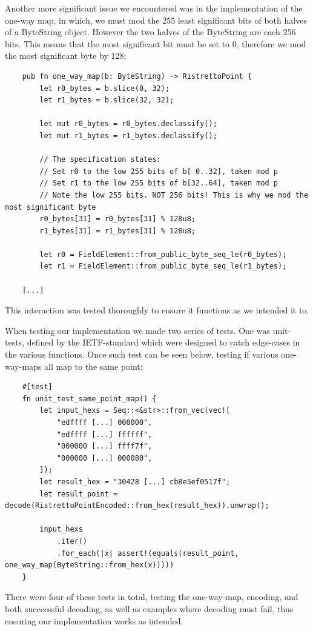\documentclass{article}
\begin{document}
Another more significant issue we encountered was in the implementation
of the one-way map, in which, we must mod the 255 least significant
bits of both halves of a ByteString object. However the two halves of
the ByteString are each 256 bits. This means that the most significant
bit must be set to 0, therefore we mod the most significant byte by
128:

\begin{lstlisting}
	pub fn one_way_map(b: ByteString) -> RistrettoPoint {
		let r0_bytes = b.slice(0, 32);
		let r1_bytes = b.slice(32, 32);

		let mut r0_bytes = r0_bytes.declassify();
		let mut r1_bytes = r1_bytes.declassify();

		// The specification states:
		// Set r0 to the low 255 bits of b[ 0..32], taken mod p
		// Set r1 to the low 255 bits of b[32..64], taken mod p
		// Note the low 255 bits. NOT 256 bits! This is why we mod the most significant byte
		r0_bytes[31] = r0_bytes[31] % 128u8;
		r1_bytes[31] = r1_bytes[31] % 128u8;

		let r0 = FieldElement::from_public_byte_seq_le(r0_bytes);
		let r1 = FieldElement::from_public_byte_seq_le(r1_bytes);

	[...]
\end{lstlisting}

This interaction was tested thoroughly to ensure it functions as we 
intended it to.

When testing our implementation we made two series of tests. 
One was unit-tests, defined by the IETF-standard which were designed 
to catch edge-cases in the various functions. Once such test can be 
seen below, testing if various one-way-maps all map to the same point:

\begin{lstlisting}
	#[test]
	fn unit_test_same_point_map() {
		let input_hexs = Seq::<&str>::from_vec(vec![
			"edffff [...] 000000",
			"edffff [...] ffffff",
			"000000 [...] ffff7f",
			"000000 [...] 000080",
		]);
		let result_hex = "30428 [...] cb8e5ef0517f";
		let result_point = decode(RistrettoPointEncoded::from_hex(result_hex)).unwrap();
	
		input_hexs
			.iter()
			.for_each(|x| assert!(equals(result_point, one_way_map(ByteString::from_hex(x)))))
	}
\end{lstlisting}

There were four of these tests in total, testing the one-way-map, 
encoding, and both succcessful decoding, as well as examples where 
decoding must fail, thus ensuring our implementation works as intended.
\end{document}
